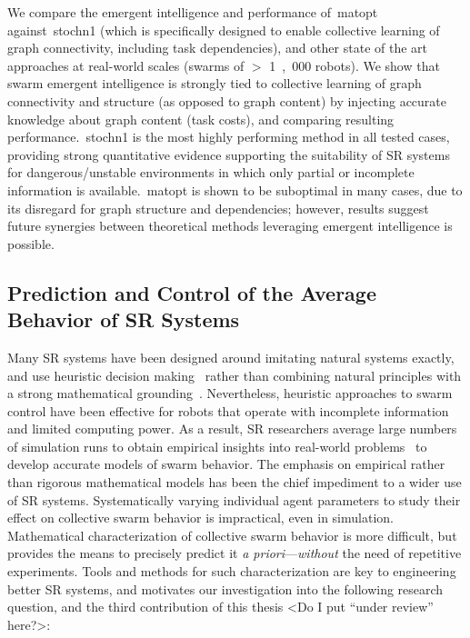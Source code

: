 We compare the emergent intelligence and performance of~\gls{matopt}
against~\gls{stochn1} (which is specifically designed to enable collective
learning of graph connectivity, including task dependencies), and other state of
the art approaches at real-world scales (swarms of $>$ \unit{1,000} robots). We
show that swarm emergent intelligence is strongly tied to collective learning of
graph connectivity and structure (as opposed to graph content) by injecting
accurate knowledge about graph content (task costs), and comparing resulting
performance.~\gls{stochn1} is the most highly performing method in all tested
cases, providing strong quantitative evidence supporting the suitability of SR
systems for dangerous/unstable environments in which only partial or incomplete
information is available.~\gls{matopt} is shown to be suboptimal in many cases,
due to its disregard for graph structure and dependencies; however, results
suggest future synergies between theoretical methods leveraging emergent
intelligence is possible.

\subsection{Prediction and Control of the Average Behavior of SR Systems}
%
Many SR systems have been designed around imitating natural systems exactly, and
use heuristic decision making~\cite{Castello2016} rather than combining natural
principles with a strong mathematical
grounding~\cite{Talamali2020}. Nevertheless, heuristic approaches to swarm
control have been effective for robots that operate with incomplete information
and limited computing power. As a result, SR researchers average large numbers
of simulation runs to obtain empirical insights into real-world
problems~\cite{Harwell2019a} to develop accurate models of swarm behavior. The
emphasis on empirical rather than rigorous mathematical models has been the
chief impediment to a wider use of SR systems.  Systematically varying
individual agent parameters to study their effect on collective swarm behavior
is impractical, even in simulation. Mathematical characterization of collective
swarm behavior is more difficult, but provides the means to precisely predict it
\emph{a priori}---\emph{without} the need of repetitive experiments. Tools and
methods for such characterization are key to engineering better SR
systems, and motivates our investigation into the following research question,
and the third contribution of this thesis <Do I put ``under review'' here?>:

